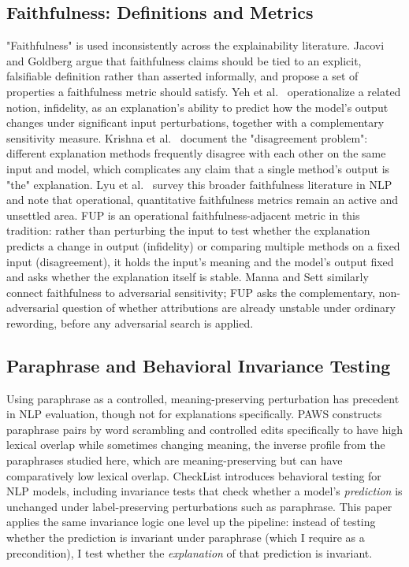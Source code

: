 \subsection{Faithfulness: Definitions and Metrics}

"Faithfulness" is used inconsistently across the explainability
literature. Jacovi and Goldberg \citep{jacovi2020towards} argue that
faithfulness claims should be tied to an explicit, falsifiable
definition rather than asserted informally, and propose a set of
properties a faithfulness metric should satisfy. Yeh et al.\
\citep{yeh2019infidelity} operationalize a related notion, infidelity,
as an explanation's ability to predict how the model's output changes
under significant input perturbations, together with a complementary
sensitivity measure. Krishna et al.\ \citep{krishna2022disagreement}
document the "disagreement problem": different explanation methods
frequently disagree with each other on the same input and model, which
complicates any claim that a single method's output is "the"
explanation. Lyu et al.\ \citep{lyu2024towards} survey this broader
faithfulness literature in NLP and note that operational, quantitative
faithfulness metrics remain an active and unsettled area. FUP is an
operational faithfulness-adjacent metric in this tradition: rather than
perturbing the input to test whether the explanation predicts a change
in output (infidelity) or comparing multiple methods on a fixed input
(disagreement), it holds the input's meaning and the model's output
fixed and asks whether the explanation itself is stable. Manna and Sett
\citep{manna2024faithfulness} similarly connect faithfulness to
adversarial sensitivity; FUP asks the complementary, non-adversarial
question of whether attributions are already unstable under ordinary
rewording, before any adversarial search is applied.

\subsection{Paraphrase and Behavioral Invariance Testing}

Using paraphrase as a controlled, meaning-preserving perturbation has
precedent in NLP evaluation, though not for explanations specifically.
PAWS \citep{zhang2019paws} constructs paraphrase pairs by word
scrambling and controlled edits specifically to have high lexical
overlap while sometimes changing meaning, the inverse profile from the
paraphrases studied here, which are meaning-preserving but can have
comparatively low lexical overlap. CheckList
\citep{ribeiro2020beyond} introduces behavioral testing for NLP models,
including invariance tests that check whether a model's
\emph{prediction} is unchanged under label-preserving perturbations such
as paraphrase. This paper applies the same invariance logic one level
up the pipeline: instead of testing whether the prediction is invariant
under paraphrase (which I require as a precondition), I test whether the
\emph{explanation} of that prediction is invariant.

